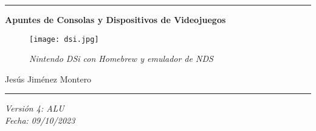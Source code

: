 \documentclass[12pt]{article}
\date{}
\begin{document}
\nocite{atkinson}
\nocite{circuitverse}
\nocite{chatgpt}
\nocite{duke}
\begin{titlepage}
        \begin{center}


        \hrule
        \vspace{1cm}
        \vspace{1cm}
        {\bfseries\huge Apuntes de Consolas y Dispositivos de Videojuegos \par}
        \vspace{2cm}

        \begin{figure}[H]
            \centering
            \texttt{[image: dsi.jpg]}
            \caption*{\footnotesize{\textit{Nintendo DSi con Homebrew y emulador de NDS}}}
            \label{fig:dsi}
        \end{figure}

        {\large
        Jesús Jiménez Montero \\
        \par}
        \vspace{1cm}
        \hrule
        \vspace{1cm}

        {\large
        \textit{Versión 4: ALU\\
        Fecha: 09/10/2023}
        \par}
        \end{center}
\end{titlepage}

\newpage
\renewcommand{\contentsname}{Tabla de contenidos}
\setcounter{secnumdepth}{5}
\tableofcontents
\setcounter{tocdepth}{4}

\newpage
\newpage
\renewcommand{\listfigurename}{Lista de figuras}
\thispagestyle{empty}
\listoffigures
\newpage

\renewcommand{\listtablename}{Lista de tablas}
\listoftables
\newpage


\end{document}
